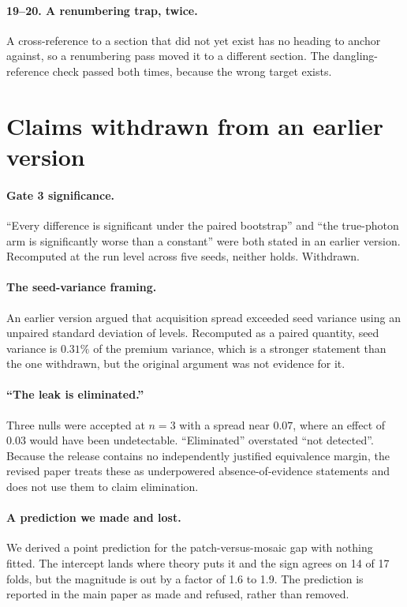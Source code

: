 \documentclass[10pt,twocolumn,letterpaper]{article}
\begin{document}
\paragraph{19--20. A renumbering trap, twice.} A cross-reference to a section that did
not yet exist has no heading to anchor against, so a renumbering pass moved it to a
different section. The dangling-reference check passed both times, because the wrong
target exists.

\section{Claims withdrawn from an earlier version}
\label{sec:withdrawn}

\paragraph{Gate 3 significance.} ``Every difference is significant under the paired
bootstrap'' and ``the true-photon arm is significantly worse than a constant'' were
both stated in an earlier version. Recomputed at the run level across five seeds,
neither holds. Withdrawn.

\paragraph{The seed-variance framing.} An earlier version argued that acquisition
spread exceeded seed variance using an unpaired standard deviation of levels.
Recomputed as a paired quantity, seed variance is $0.31\%$ of the premium variance,
which is a stronger statement than the one withdrawn, but the original argument was
not evidence for it.

\paragraph{``The leak is eliminated.''} Three nulls were accepted at $n = 3$ with a
spread near $0.07$, where an effect of $0.03$ would have been undetectable.
``Eliminated'' overstated ``not detected''. Because the release contains no
independently justified equivalence margin, the revised paper treats these as
underpowered absence-of-evidence statements and does not use them to claim
elimination.

\paragraph{A prediction we made and lost.} We derived a point prediction for the
patch-versus-mosaic gap with nothing fitted. The intercept lands where theory puts it
and the sign agrees on 14 of 17 folds, but the magnitude is out by a factor of 1.6 to
1.9. The prediction is reported in the main paper as made and refused, rather than
removed.
\end{document}
